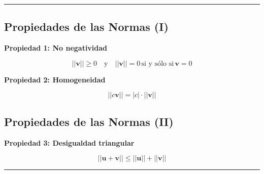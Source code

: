 \documentclass[
  letterpaper,
  DIV=11,
  numbers=noendperiod]{scrartcl}
\begin{document}
\begin{center}\rule{0.5\linewidth}{0.5pt}\end{center}

\subsection{Propiedades de las Normas
(I)}\label{propiedades-de-las-normas-i}

\textbf{Propiedad 1: No negatividad}

\[
||\mathbf{v}|| \geq 0 \quad \text{y} \quad ||\mathbf{v}|| = 0 \, \text{si y sólo si} \, \mathbf{v} = 0
\]

\textbf{Propiedad 2: Homogeneidad}

\[
||c \mathbf{v}|| = |c| \cdot ||\mathbf{v}||
\]

\subsection{Propiedades de las Normas
(II)}\label{propiedades-de-las-normas-ii}

\textbf{Propiedad 3: Desigualdad triangular}

\[
||\mathbf{u} + \mathbf{v}|| \leq ||\mathbf{u}|| + ||\mathbf{v}||
\]

\begin{center}\rule{0.5\linewidth}{0.5pt}\end{center}
\end{document}
